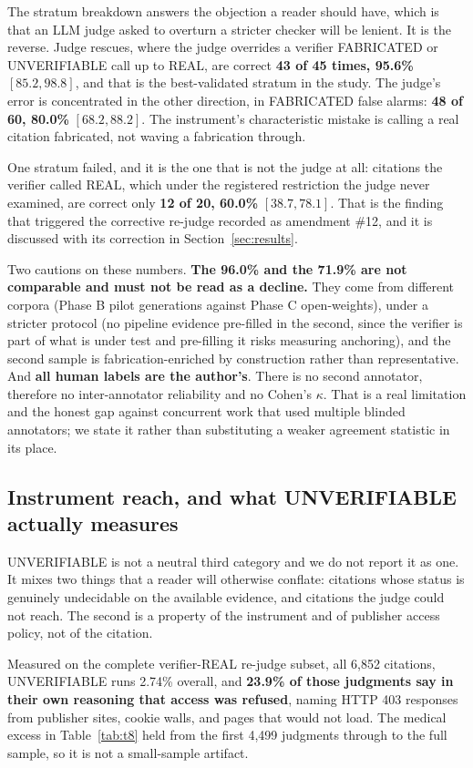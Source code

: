 The stratum breakdown answers the objection a reader should have, which is that
an LLM judge asked to overturn a stricter checker will be lenient. It is the
reverse. Judge rescues, where the judge overrides a verifier FABRICATED or
UNVERIFIABLE call up to REAL, are correct \textbf{43 of 45 times, 95.6\%}
$[85.2, 98.8]$, and that is the best-validated stratum in the study. The judge's
error is concentrated in the other direction, in FABRICATED false alarms:
\textbf{48 of 60, 80.0\%} $[68.2, 88.2]$. The instrument's characteristic mistake
is calling a real citation fabricated, not waving a fabrication through.

One stratum failed, and it is the one that is not the judge at all: citations the
verifier called REAL, which under the registered restriction the judge never
examined, are correct only \textbf{12 of 20, 60.0\%} $[38.7, 78.1]$. That is the
finding that triggered the corrective re-judge recorded as amendment \#12, and it
is discussed with its correction in Section~\ref{sec:results}.

Two cautions on these numbers. \textbf{The 96.0\% and the 71.9\% are not
comparable and must not be read as a decline.} They come from different corpora
(Phase B pilot generations against Phase C open-weights), under a stricter
protocol (no pipeline evidence pre-filled in the second, since the verifier is
part of what is under test and pre-filling it risks measuring anchoring), and the
second sample is fabrication-enriched by construction rather than
representative. And \textbf{all human labels are the author's}. There is no
second annotator, therefore no inter-annotator reliability and no Cohen's
$\kappa$. That is a real limitation and the honest gap against concurrent work
that used multiple blinded annotators; we state it rather than substituting a
weaker agreement statistic in its place.

\subsection{Instrument reach, and what UNVERIFIABLE actually measures}

UNVERIFIABLE is not a neutral third category and we do not report it as one. It
mixes two things that a reader will otherwise conflate: citations whose status is
genuinely undecidable on the available evidence, and citations the judge could
not reach. The second is a property of the instrument and of publisher access
policy, not of the citation.

Measured on the complete verifier-REAL re-judge subset, all 6{,}852 citations,
UNVERIFIABLE runs 2.74\% overall, and \textbf{23.9\% of those judgments say in
their own reasoning that access was refused}, naming HTTP 403 responses from
publisher sites, cookie walls, and pages that would not load. The medical excess
in Table~\ref{tab:t8} held from the first 4{,}499 judgments through to the full
sample, so it is not a small-sample artifact.

